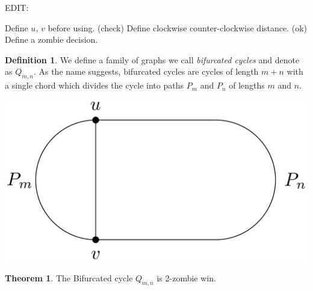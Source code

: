 \documentclass[letterpaper, 10pt]{article}
\begin{document}
\theoremstyle{definition}
\newtheorem{definition}{Definition}
\newtheorem{theorem}{Theorem}
\newtheorem{proposition}{Proposition}
\newtheorem{corollary}{Corollary}
\newtheorem{lemma}{Lemma}
\newtheorem{proofpart}{Part}
\makeatletter
{}
\makeatother
EDIT:

Define $u$, $v$ before using. (check)
Define clockwise counter-clockwise distance. (ok)
Define a zombie decision.

\begin{definition}
 We define a family of graphs we call \emph{bifurcated cycles} and denote as $Q_{m,n}$.
 As the name suggests, bifurcated cycles are cycles of length $m+n$ with a single chord
 which divides the cycle into paths $P_m$ and $P_n$ of lengths $m$ and $n$.
\end{definition}

\begin{center}
 \includegraphics[scale=0.20]{Q_m_n_basic}
\end{center}

\begin{theorem}
The Bifurcated cycle $Q_{m,n}$ is 2-zombie win.
\end{theorem}
\end{document}
